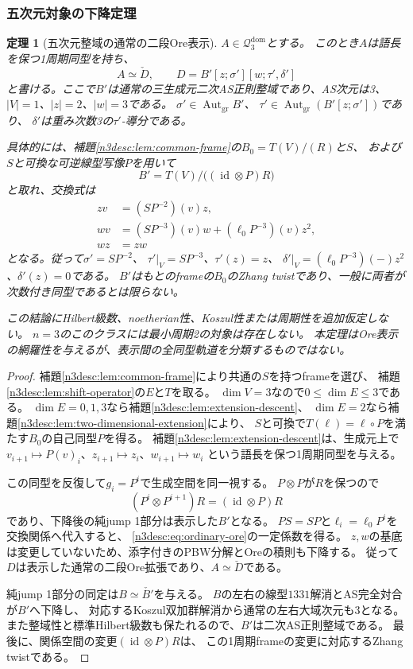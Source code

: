 \documentclass[11pt,a4paper]{ltjsarticle}
\newtheorem{theorem}{定理}[section]
\theoremstyle{definition}
\begin{document}
\subsubsection{五次元対象の下降定理}
\begin{theorem}[五次元整域の通常の二段Ore表示]
\label{genidx:thm:three-light-descent}
$A\in\mathcal Q_3^{\mathrm{dom}}$とする。
このとき$A$は語長を保つ1周期同型を持ち、
\[
A\simeq\check D,\qquad
D=B'[z;\sigma'][w;\tau',\delta']
\]
と書ける。ここで$B'$は通常の三生成元二次AS正則整域であり、AS次元は3、
$|V|=1$、$|z|=2$、$|w|=3$である。
$\sigma'\in\operatorname{Aut}_{\mathrm{gr}}B'$、
$\tau'\in\operatorname{Aut}_{\mathrm{gr}}(B'[z;\sigma'])$であり、
$\delta'$は重み次数3の$\tau'$-導分である。

具体的には、補題\ref{n3desc:lem:common-frame}の$B_0=T(V)/(R)$と$S$、
および$S$と可換な可逆線型写像$P$を用いて
\[
B'=T(V)/\bigl((\operatorname{id}\otimes P)R\bigr)
\]
と取れ、交換式は
\begin{equation}\label{n3desc:eq:ordinary-ore}
\begin{aligned}
zv&=(SP^{-2})(v)z,\\
wv&=(SP^{-3})(v)w+(\ell_0P^{-3})(v)z^2,\\
wz&=zw
\end{aligned}
\end{equation}
となる。従って$\sigma'=SP^{-2}$、
$\tau'|_V=SP^{-3}$、$\tau'(z)=z$、
$\delta'|_V=(\ell_0P^{-3})(-)z^2$、$\delta'(z)=0$である。
$B'$はもとのframeの$B_0$のZhang twistであり、一般に両者が次数付き同型であるとは限らない。

この結論にHilbert級数、noetherian性、Koszul性または周期性を追加仮定しない。
$n=3$のこのクラスには最小周期2の対象は存在しない。
本定理はOre表示の網羅性を与えるが、表示間の全同型軌道を分類するものではない。
\end{theorem}
\begin{proof}
補題\ref{n3desc:lem:common-frame}により共通の$S$を持つframeを選び、
補題\ref{n3desc:lem:shift-operator}の$E$と$T$を取る。
$\dim V=3$なので$0\leq\dim E\leq3$である。
$\dim E=0,1,3$なら補題\ref{n3desc:lem:extension-descent}、
$\dim E=2$なら補題\ref{n3desc:lem:two-dimensional-extension}により、
$S$と可換で$T(\ell)=\ell\circ P$を満たす$B_0$の自己同型$P$を得る。
補題\ref{n3desc:lem:extension-descent}は、生成元上で
$v_{i+1}\mapsto P(v)_i$、$z_{i+1}\mapsto z_i$、$w_{i+1}\mapsto w_i$
という語長を保つ1周期同型を与える。

この同型を反復して$g_i=P^i$で生成空間を同一視する。
$P\otimes P$が$R$を保つので
\[
(P^i\otimes P^{i+1})R=(\operatorname{id}\otimes P)R
\]
であり、下降後の純jump 1部分は表示した$B'$となる。
$PS=SP$と$\ell_i=\ell_0P^i$を交換関係へ代入すると、
\eqref{n3desc:eq:ordinary-ore}の一定係数を得る。
$z,w$の基底は変更していないため、添字付きのPBW分解とOreの積則も下降する。
従って$D$は表示した通常の二段Ore拡張であり、$A\simeq\check D$である。

純jump 1部分の同定は$B\simeq\check{B'}$を与える。
$B$の左右の線型$1331$解消とAS完全対合が$B'$へ下降し、
対応するKoszul双加群解消から通常の左右大域次元も3となる。
また整域性と標準Hilbert級数も保たれるので、$B'$は二次AS正則整域である。
最後に、関係空間の変更$(\operatorname{id}\otimes P)R$は、
この1周期frameの変更に対応するZhang twistである。
\end{proof}
\end{document}
